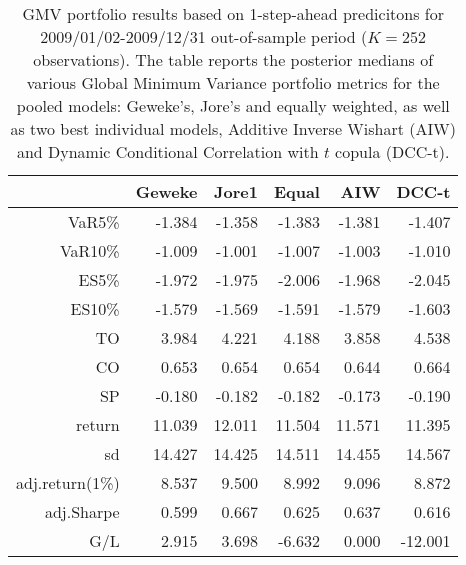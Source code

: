 \begin{table}[ht]
\centering
\caption{GMV portfolio results based on 1-step-ahead predicitons 
             for  2009/01/02-2009/12/31 out-of-sample period ($K=252$ observations).
             The table reports the posterior medians of various Global Minimum
             Variance portfolio metrics for the pooled models: 
             Geweke's, Jore's and equally weighted, 
             as well as two best individual models, Additive Inverse Wishart (AIW) and 
             Dynamic Conditional Correlation with $t$ copula (DCC-t).} 
\label{table:gmvfull5}
\begin{tabular}{rrrrrr}
  \hline
 & Geweke & Jore1 & Equal & AIW & DCC-t \\ 
  \hline
VaR5\% & -1.384 & -1.358 & -1.383 & -1.381 & -1.407 \\ 
  VaR10\% & -1.009 & -1.001 & -1.007 & -1.003 & -1.010 \\ 
  ES5\% & -1.972 & -1.975 & -2.006 & -1.968 & -2.045 \\ 
  ES10\% & -1.579 & -1.569 & -1.591 & -1.579 & -1.603 \\ 
  TO & 3.984 & 4.221 & 4.188 & 3.858 & 4.538 \\ 
  CO & 0.653 & 0.654 & 0.654 & 0.644 & 0.664 \\ 
  SP & -0.180 & -0.182 & -0.182 & -0.173 & -0.190 \\ 
   \hline
return & 11.039 & 12.011 & 11.504 & 11.571 & 11.395 \\ 
  sd & 14.427 & 14.425 & 14.511 & 14.455 & 14.567 \\ 
  adj.return(1\%) & 8.537 & 9.500 & 8.992 & 9.096 & 8.872 \\ 
  adj.Sharpe & 0.599 & 0.667 & 0.625 & 0.637 & 0.616 \\ 
  G/L & 2.915 & 3.698 & -6.632 & 0.000 & -12.001 \\ 
   \hline
\end{tabular}
\end{table}
